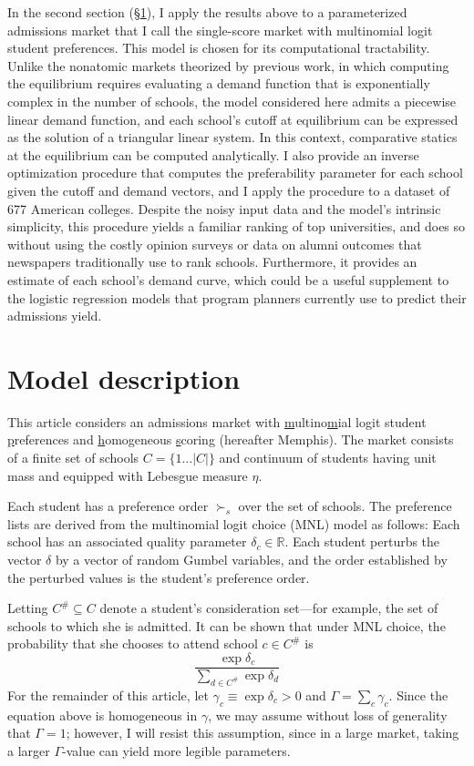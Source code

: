 \documentclass[12pt]{article}
\numberwithin{equation}{subsection}
\theoremstyle{definition}
\begin{document}
In the second section (\S\ref{singlescoremodel}), I apply the results above to a parameterized admissions market that I call the single-score market with multinomial logit student preferences. This model is chosen for its computational tractability. Unlike the nonatomic markets theorized by previous work, in which computing the equilibrium requires evaluating a demand function that is exponentially complex in the number of schools, the model considered here admits a piecewise linear demand function, and each school's cutoff at equilibrium can be expressed as the solution of a triangular linear system. In this context, comparative statics at the equilibrium can be computed analytically. I also provide an inverse optimization procedure that computes the preferability parameter for each school given the cutoff and demand vectors, and I apply the procedure to a dataset of 677 American colleges. Despite the noisy input data and the model's intrinsic simplicity, this procedure yields a familiar ranking of top universities, and does so without using the costly opinion surveys or data on alumni outcomes that newspapers traditionally use to rank schools. Furthermore, it provides an estimate of each school's demand curve, which could be a useful supplement to the logistic regression models that program planners currently use to predict their admissions yield.

\section{Model description} \label{singlescoremodel}
This article considers an admissions market with \underline{m}ultino\underline{m}ial logit student \underline{p}references and \underline{h}omogeneous \underline{s}coring (hereafter Memphis). The market consists of a finite set of schools $C = \{ 1\dots |C| \}$ and continuum of students having unit mass and equipped with Lebesgue measure $\eta$.

Each student has a preference order $\succ_s$ over the set of schools. The preference lists are derived from the multinomial logit choice (MNL) model as follows: Each school has an associated quality parameter $\delta_c \in \mathbb{R}$. Each student perturbs the vector $\delta$ by a vector of random Gumbel variables, and the order established by the perturbed values is the student's preference order.

Letting $C^\# \subseteq C$ denote a student's consideration set---for example, the set of schools to which she is admitted. It can be shown that under MNL choice, the probability that she chooses to attend school $c \in C^\#$ is
\[\frac{\exp \delta_c}{\sum_{d \in C^\#} \exp \delta_d}\]
For the remainder of this article, let $\gamma_c \equiv \exp \delta_c > 0$ and $\Gamma = \sum_c \gamma_c$. Since the equation above is homogeneous in $\gamma$, we may assume without loss of generality that $\Gamma = 1$; however, I will resist this assumption, since in a large market, taking a larger $\Gamma$-value can yield more legible parameters. 
\end{document}
